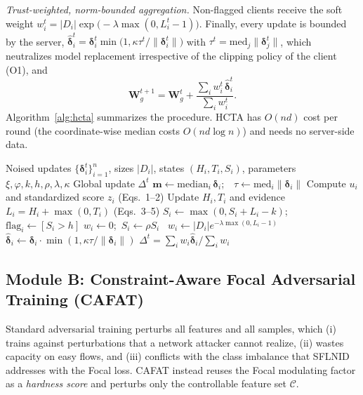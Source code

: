 \documentclass[journal]{IEEEtran}
\begin{document}
\emph{Trust-weighted, norm-bounded aggregation.} Non-flagged clients receive the soft weight $w_i^t=|D_i|\exp\!\big(-\lambda\max(0,L_i^t-1)\big)$. Finally, every update is bounded by the server, $\hat{\boldsymbol{\delta}}_i^t=\boldsymbol{\delta}_i^t\min\!\big(1,\kappa\tau^t/\|\boldsymbol{\delta}_i^t\|\big)$ with $\tau^t=\mathrm{med}_j\|\boldsymbol{\delta}_j^t\|$, which neutralizes model replacement irrespective of the clipping policy of the client (O1), and
\begin{equation}
\mathbf{W}_g^{t+1}=\mathbf{W}_g^t+\frac{\sum_i w_i^t\,\hat{\boldsymbol{\delta}}_i^t}{\sum_i w_i^t}.
\end{equation}
Algorithm~\ref{alg:hcta} summarizes the procedure. HCTA has $O(nd)$ cost per round (the coordinate-wise median costs $O(nd\log n)$) and needs no server-side data.

\begin{algorithm}[t]
\caption{HCTA: Holt--CUSUM Trust Aggregation}
\label{alg:hcta}
\begin{algorithmic}[1]
\Require Noised updates $\{\boldsymbol{\delta}_i^t\}_{i=1}^n$, sizes $|D_i|$, states $(H_i,T_i,S_i)$, parameters $\xi,\varphi,k,h,\rho,\lambda,\kappa$
\Ensure Global update $\Delta^t$
\State $\mathbf{m}\gets\mathrm{median}_i\,\boldsymbol{\delta}_i$;\ \ $\tau\gets\mathrm{med}_i\|\boldsymbol{\delta}_i\|$
\State Compute $u_i$ and standardized score $z_i$ \hfill (Eqs.~1--2)
\State Update $H_i,T_i$ and evidence $L_i=H_i+\max(0,T_i)$ \hfill (Eqs.~3--5)
\State $S_i\gets\max(0,S_i+L_i-k)$;\ \ $\text{flag}_i\gets[S_i>h]$
 $w_i\gets0$;\ $S_i\gets\rho S_i$ \Else\ $w_i\gets|D_i|e^{-\lambda\max(0,L_i-1)}$ \EndIf
\State $\hat{\boldsymbol{\delta}}_i\gets\boldsymbol{\delta}_i\cdot\min(1,\kappa\tau/\|\boldsymbol{\delta}_i\|)$
\EndFor
\State \Return $\Delta^t=\sum_iw_i\hat{\boldsymbol{\delta}}_i/\sum_iw_i$
\end{algorithmic}
\end{algorithm}

\subsection{Module B: Constraint-Aware Focal Adversarial Training (CAFAT)}
Standard adversarial training perturbs all features and all samples, which (i) trains against perturbations that a network attacker cannot realize, (ii) wastes capacity on easy flows, and (iii) conflicts with the class imbalance that SFLNID addresses with the Focal loss. CAFAT instead reuses the Focal modulating factor as a \emph{hardness score} and perturbs only the controllable feature set $\mathcal{C}$.
\end{document}

